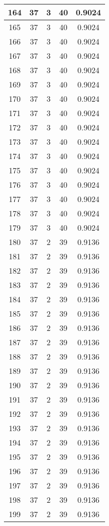 \documentclass[letterpaper, 12pt]{article}
\begin{document}
\begin{longtable}{|c|c|c|c|c|}
\hline
164 & 37 & 3 & 40 & 0.9024 \\
\hline
165 & 37 & 3 & 40 & 0.9024 \\
\hline
166 & 37 & 3 & 40 & 0.9024 \\
\hline
167 & 37 & 3 & 40 & 0.9024 \\
\hline
168 & 37 & 3 & 40 & 0.9024 \\
\hline
169 & 37 & 3 & 40 & 0.9024 \\
\hline
170 & 37 & 3 & 40 & 0.9024 \\
\hline
171 & 37 & 3 & 40 & 0.9024 \\
\hline
172 & 37 & 3 & 40 & 0.9024 \\
\hline
173 & 37 & 3 & 40 & 0.9024 \\
\hline
174 & 37 & 3 & 40 & 0.9024 \\
\hline
175 & 37 & 3 & 40 & 0.9024 \\
\hline
176 & 37 & 3 & 40 & 0.9024 \\
\hline
177 & 37 & 3 & 40 & 0.9024 \\
\hline
178 & 37 & 3 & 40 & 0.9024 \\
\hline
179 & 37 & 3 & 40 & 0.9024 \\
\hline
180 & 37 & 2 & 39 & 0.9136 \\
\hline
181 & 37 & 2 & 39 & 0.9136 \\
\hline
182 & 37 & 2 & 39 & 0.9136 \\
\hline
183 & 37 & 2 & 39 & 0.9136 \\
\hline
184 & 37 & 2 & 39 & 0.9136 \\
\hline
185 & 37 & 2 & 39 & 0.9136 \\
\hline
186 & 37 & 2 & 39 & 0.9136 \\
\hline
187 & 37 & 2 & 39 & 0.9136 \\
\hline
188 & 37 & 2 & 39 & 0.9136 \\
\hline
189 & 37 & 2 & 39 & 0.9136 \\
\hline
190 & 37 & 2 & 39 & 0.9136 \\
\hline
191 & 37 & 2 & 39 & 0.9136 \\
\hline
192 & 37 & 2 & 39 & 0.9136 \\
\hline
193 & 37 & 2 & 39 & 0.9136 \\
\hline
194 & 37 & 2 & 39 & 0.9136 \\
\hline
195 & 37 & 2 & 39 & 0.9136 \\
\hline
196 & 37 & 2 & 39 & 0.9136 \\
\hline
197 & 37 & 2 & 39 & 0.9136 \\
\hline
198 & 37 & 2 & 39 & 0.9136 \\
\hline
199 & 37 & 2 & 39 & 0.9136 \\
\hline
\end{longtable}
\end{document}
